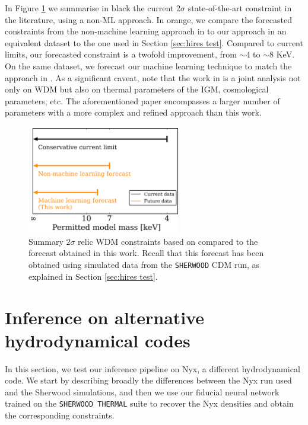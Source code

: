 In Figure \ref{fig: wdm constraints summary} we summarise in black the current $2\sigma$ state-of-the-art constraint in the literature, using a non-ML approach. In orange, we compare the forecasted constraints from the non-machine learning approach in \cite{sherwood_wdm} to our approach in an equivalent dataset to the one used in Section \ref{sec:hires test}. Compared to current limits, our forecasted constraint is a twofold improvement, from $\sim 4$ to $\sim 8$ KeV. On the same dataset, we forecast our machine learning technique to match the approach in \cite{sherwood_wdm}. As a significant caveat, note that the work in \cite{sherwood_wdm} is a joint analysis not only on WDM but also on thermal parameters of the IGM, cosmological parameters, etc. The aforementioned paper encompasses a larger number of parameters with a more complex and refined approach than this work.


\begin{figure}
    \centering
    \includegraphics[width=0.6\textwidth]{img/ML/limits_summary.png}
    \caption{Summary $2\sigma$ relic WDM constraints based on \cite{sherwood_wdm} compared to the forecast obtained in this work. Recall that this forecast has been obtained using simulated data from the \texttt{SHERWOOD} CDM run, as explained in Section \ref{sec:hires test}.}
    \label{fig: wdm constraints summary}
\end{figure}













\section{Inference on alternative hydrodynamical codes}
In this section, we test our inference pipeline on Nyx, a different hydrodynamical code. We start by describing broadly the differences between the Nyx run used and the Sherwood simulations, and then we use our fiducial neural network trained on the \texttt{SHERWOOD THERMAL} suite to recover the Nyx densities and obtain the corresponding constraints.


